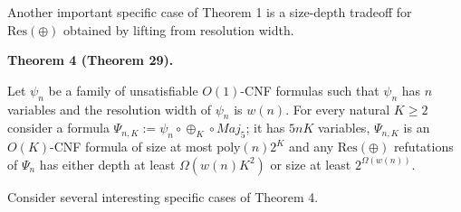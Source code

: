 \documentclass[10pt,a4paper]{article}
\begin{document}
Another important specific case of Theorem 1 is a size-depth
tradeoff for $\mathrm{Res}(\oplus)$ obtained by lifting from resolution width.\par



\par\medskip\noindent\textbf{
Theorem 4 (Theorem 29).
}\par



Let $\psi_{n}$ be a family of unsatisfiable $O(1)$-CNF formulas such that
$\psi_{n}$ has $n$ variables and the resolution width of $\psi_{n}$ is $w(n)$.
For every natural $K\geq 2$ consider a formula
$\Psi_{n,K}:=\psi_{n}\circ\oplus_{K}\circ Maj_{5}$; it has $5nK$ variables,
$\Psi_{n,K}$ is an $O(K)$-CNF formula of size at most $\mathrm{poly}(n)2^{K}$ and any
$\mathrm{Res}(\oplus)$ refutations of $\Psi_{n}$ has either depth at least $\Omega(w(n)K^{2})$
or size at least $2^{\Omega(w(n))}$.\par




Consider several interesting specific cases of Theorem 4.\par
\end{document}
